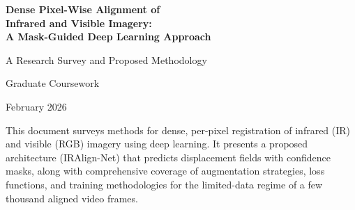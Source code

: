 \documentclass[12pt,a4paper,oneside]{report}
\begin{document}
\begin{titlepage}
\centering
\vspace*{2cm}
{\Huge\bfseries Dense Pixel-Wise Alignment of\\[0.3em]
Infrared and Visible Imagery:\\[0.3em]
A Mask-Guided Deep Learning Approach\par}
\vspace{2cm}
{\Large A Research Survey and Proposed Methodology\par}
\vspace{1.5cm}
{\large Graduate Coursework\par}
\vspace{1cm}
{\large February 2026\par}
\vfill
{\normalsize
This document surveys methods for dense, per-pixel registration of infrared (IR) and
visible (RGB) imagery using deep learning. It presents a proposed architecture
(IRAlign-Net) that predicts displacement fields with confidence masks, along with
comprehensive coverage of augmentation strategies, loss functions, and training
methodologies for the limited-data regime of a few thousand aligned video frames.\par}
\end{titlepage}

\tableofcontents
\newpage














\end{document}
